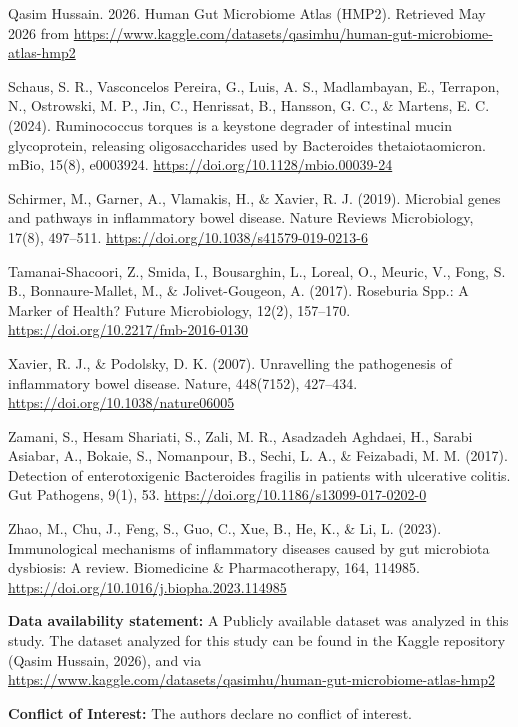 \documentclass[twoside,twocolumn,10pt]{article}
\begin{document}
\medskip
Qasim Hussain. 2026. Human Gut Microbiome Atlas (HMP2). Retrieved May 2026 from \url{https://www.kaggle.com/datasets/qasimhu/human-gut-microbiome-atlas-hmp2} 

\medskip
Schaus, S. R., Vasconcelos Pereira, G., Luis, A. S., Madlambayan, E., Terrapon, N., Ostrowski, M. P., Jin, C., Henrissat, B., Hansson, G. C., \& Martens, E. C. (2024). Ruminococcus torques is a keystone degrader of intestinal mucin glycoprotein, releasing oligosaccharides used by Bacteroides thetaiotaomicron. mBio, 15(8), e0003924. \url{https://doi.org/10.1128/mbio.00039-24} 

\medskip
Schirmer, M., Garner, A., Vlamakis, H., \& Xavier, R. J. (2019). Microbial genes and pathways in inflammatory bowel disease. Nature Reviews Microbiology, 17(8), 497–511. \url{https://doi.org/10.1038/s41579-019-0213-6}

\medskip
Tamanai-Shacoori, Z., Smida, I., Bousarghin, L., Loreal, O., Meuric, V., Fong, S. B., Bonnaure-Mallet, M., \& Jolivet-Gougeon, A. (2017). Roseburia Spp.: A Marker of Health? Future Microbiology, 12(2), 157–170. \url{https://doi.org/10.2217/fmb-2016-0130}

\medskip\medskip
Xavier, R. J., \& Podolsky, D. K. (2007). Unravelling the pathogenesis of inflammatory bowel disease. Nature, 448(7152), 427–434. \url{https://doi.org/10.1038/nature06005}

\medskip
Zamani, S., Hesam Shariati, S., Zali, M. R., Asadzadeh Aghdaei, H., Sarabi Asiabar, A., Bokaie, S., Nomanpour, B., Sechi, L. A., \& Feizabadi, M. M. (2017). Detection of enterotoxigenic Bacteroides fragilis in patients with ulcerative colitis. Gut Pathogens, 9(1), 53. \url{https://doi.org/10.1186/s13099-017-0202-0}

\medskip
Zhao, M., Chu, J., Feng, S., Guo, C., Xue, B., He, K., \& Li, L. (2023). Immunological mechanisms of inflammatory diseases caused by gut microbiota dysbiosis: A review. Biomedicine \& Pharmacotherapy, 164, 114985. \url{https://doi.org/10.1016/j.biopha.2023.114985}



\vspace{0.5cm}

\small
\textbf{Data availability statement:} A Publicly available dataset was analyzed in this study. The dataset analyzed for this study can be found in the Kaggle repository (Qasim Hussain, 2026), and via \url{https://www.kaggle.com/datasets/qasimhu/human-gut-microbiome-atlas-hmp2} 

\small
\textbf{Conflict of Interest:} The authors declare no conflict of interest.
\end{document}
